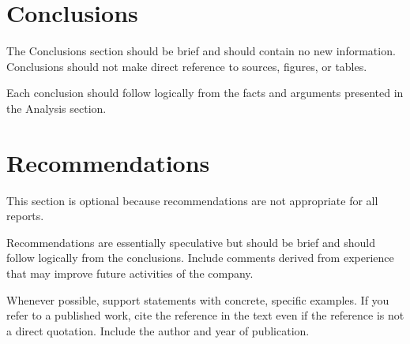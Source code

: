 \documentclass[12pt]{article}
\begin{document}



\newpage
\section{Conclusions}


The Conclusions section should be brief and should contain no new information. Conclusions should not make direct reference to sources, figures, or tables.

Each conclusion should follow logically from the facts and arguments presented in the Analysis section.

\newpage
\section{Recommendations}


This section is optional because recommendations are not appropriate for all reports. 

Recommendations are essentially speculative but should be brief and should follow logically from the conclusions. Include comments derived from experience that may improve future activities of the company.




Whenever possible, support statements with concrete, specific examples. If you refer to a published work, cite the reference in the text even if the reference is not a direct quotation. Include the author and year of publication.
\end{document}
